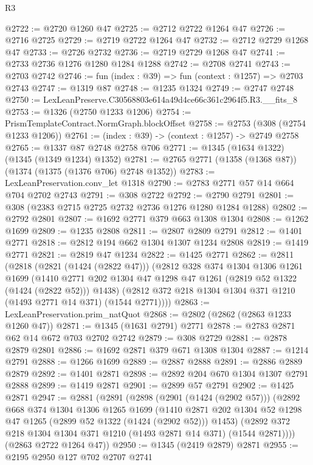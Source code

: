 \begin{lexlean}{R3}
\begin{coremodule}
@2722 := @2720 @1260 @47
@2725 := @2712 @2722 @1264 @47
@2726 := @2716 @2725
@2729 := @2719 @2722 @1264 @47
@2732 := @2712 @2729 @1268 @47
@2733 := @2726 @2732
@2736 := @2719 @2729 @1268 @47
@2741 := @2733 @2736 @1276 @1280 @1284 @1288
@2742 := @2708 @2741
@2743 := @2703 @2742
@2746 := fun (index : @39) => fun (context : @1257) => @2703 @2743
@2747 := @1319 @87
@2748 := @1235 @1324
@2749 := @2747 @2748
@2750 := LexLeanPreserve.C30568803e614a49d4ce66c361c2964f5.R3.__fits_8
@2753 := @1326 (@2750 @1233 @1206)
@2754 := PrismTemplateContract.NormGraph.blockOffset
@2758 := @2753 (@308 (@2754 @1233 @1206))
@2761 := (index : @39) -> (context : @1257) -> @2749 @2758
@2765 := @1337 @87 @2748 @2758 @706
@2771 := @1345 (@1634 @1322) (@1345 (@1349 @1234) @1352)
@2781 := @2765 @2771 (@1358 (@1368 @87)) (@1374 (@1375 (@1376 @706) @2748 @1352))
@2783 := LexLeanPreservation.conv_let @1318
@2790 := @2783 @2771 @57 @14 @664 @704 @2702 @2743
@2791 := @308 @2722
@2792 := @2790 @2791
@2801 := @308 (@2383 @2715 @2725 @2732 @2736 @1276 @1280 @1284 @1288)
@2802 := @2792 @2801
@2807 := @1692 @2771 @379 @663 @1308 @1304
@2808 := @1262 @1699
@2809 := @1235 @2808
@2811 := @2807 @2809 @2791
@2812 := @1401 @2771
@2818 := @2812 @194 @662 @1304 @1307 @1234 @2808
@2819 := @1419 @2771
@2821 := @2819 @47 @1234
@2822 := @1425 @2771
@2862 := @2811
    (@2818
      (@2821 (@1424 (@2822 @47)))
      (@2812
        @328
        @374
        @1304
        @1306
        @1261
        @1699
        (@1410 @2771 @202 @1304 @47 @1298 @47 @1261 (@2819 @52 @1322 (@1424 (@2822 @52))) @1438)
        (@2812 @372 @218 @1304 @1304 @371 @1210 (@1493 @2771 @14 @371) (@1544 @2771))))
@2863 := LexLeanPreservation.prim_natQuot
@2868 := @2802 (@2862 (@2863 @1233 @1260 @47))
@2871 := @1345 (@1631 @2791) @2771
@2878 := @2783 @2871 @62 @14 @672 @703 @2702 @2742
@2879 := @308 @2729
@2881 := @2878 @2879 @2801
@2886 := @1692 @2871 @379 @671 @1308 @1304
@2887 := @1214 @2791
@2888 := @1266 @1699
@2889 := @2887 @2888
@2891 := @2886 @2889 @2879
@2892 := @1401 @2871
@2898 := @2892 @204 @670 @1304 @1307 @2791 @2888
@2899 := @1419 @2871
@2901 := @2899 @57 @2791
@2902 := @1425 @2871
@2947 := @2881
    (@2891
      (@2898
        (@2901 (@1424 (@2902 @57)))
        (@2892
          @668
          @374
          @1304
          @1306
          @1265
          @1699
          (@1410 @2871 @202 @1304 @52 @1298 @47 @1265 (@2899 @52 @1322 (@1424 (@2902 @52))) @1453)
          (@2892 @372 @218 @1304 @1304 @371 @1210 (@1493 @2871 @14 @371) (@1544 @2871))))
      (@2863 @2722 @1264 @47))
@2950 := @1345 (@2419 @2879) @2871
@2955 := @2195 @2950 @127 @702 @2707 @2741

\end{coremodule}
\end{lexlean}

